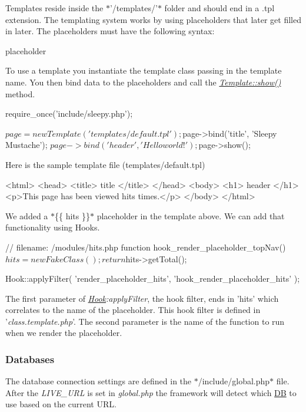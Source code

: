 Templates reside inside the $\ast$'/templates/'$\ast$ folder and should end in a .tpl extension. The templating system works by using placeholders that later get filled in later. The placeholders must have the following syntax\-: \begin{DoxyVerb}{{ placeholder }}
\end{DoxyVerb}


To use a template you instantiate the template class passing in the template name. You then bind data to the placeholders and call the {\itshape \hyperlink{class_template_a2b8e3779f5bd8c38f70307574859bd36}{Template\-::show()}} method. \begin{DoxyVerb}require_once('include/sleepy.php');

$page = new Template('templates/default.tpl');
$page->bind('title', 'Sleepy Mustache');
$page->bind('header', 'Hello world!');
$page->show();
\end{DoxyVerb}


Here is the sample template file (templates/default.\-tpl) \begin{DoxyVerb}<html>
    <head>
        <title>{{ title }}</title>
    </head>
    <body>
        <h1>{{ header }}</h1>
        <p>This page has been viewed {{ hits }} times.</p>
    </body>
</html>
\end{DoxyVerb}


We added a $\ast$\{\{ hits \}\}$\ast$ placeholder in the template above. We can add that functionality using Hooks. \begin{DoxyVerb}// filename: /modules/hits.php
function hook_render_placeholder_topNav() {
    $hits = new FakeClass();

    return $hits->getTotal();
}

Hook::applyFilter(
    'render_placeholder_hits',
    'hook_render_placeholder_hits'
);
\end{DoxyVerb}


The first parameter of {\itshape \hyperlink{class_hook}{Hook}\-:apply\-Filter}, the hook filter, ends in 'hits' which correlates to the name of the placeholder. This hook filter is defined in '{\itshape class.\-template.\-php}'. The second parameter is the name of the function to run when we render the placeholder.

\subsubsection*{Databases}

The database connection settings are defined in the $\ast$/include/global.php$\ast$ file. After the {\itshape L\-I\-V\-E\-\_\-\-U\-R\-L} is set in {\itshape global.\-php} the framework will detect which \hyperlink{class_d_b}{D\-B} to use based on the current U\-R\-L.

